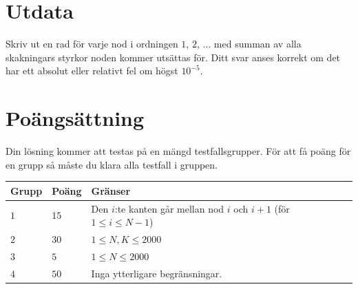 \section*{Utdata}
Skriv ut en rad för varje nod i ordningen $1$, $2$, $\dots$ med summan av alla skakningars styrkor noden kommer utsättas för.
Ditt svar anses korrekt om det har ett absolut eller relativt fel om högst $10^{-5}$.

\section*{Poängsättning}
Din lösning kommer att testas på en mängd testfallsgrupper.
För att få poäng för en grupp så måste du klara alla testfall i gruppen.

\noindent
\begin{tabular}{| l | l | l |}
  \hline
  \textbf{Grupp} & \textbf{Poäng} & \textbf{Gränser} \\ \hline
  $1$    & $15$       &  Den $i$:te kanten går mellan nod $i$ och $i+1$ (för $1 \le i \le N-1$) \\ \hline 
  $2$    & $30$       &  $1 \le N,K \le 2000$ \\ \hline
  $3$    & $5$        &  $1 \le N \le 2000$ \\ \hline
  $4$    & $50$       &  Inga ytterligare begränsningar. \\ \hline
\end{tabular}

